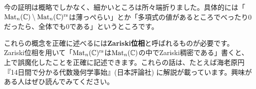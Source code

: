 今の証明は概略でしかなく、細かいところは所々端折りました。具体的には「$\operatorname{Mat}_n(\mathbb{C}) \setminus \operatorname{Mat}_n(\mathbb{C})^{\text{rs}}$は薄っぺらい」とか「多項式の値があるところでべったり$0$だったら、全体でも$0$である」というところです。

これらの概念を正確に述べるには\textbf{Zariski位相}と呼ばれるものが必要です。Zariski位相を用いて「$\operatorname{Mat}_n(\mathbb{C})^{\text{rs}}$は$\operatorname{Mat}_n(\mathbb{C})$の中でZariski稠密である」書くと、上で誤魔化したことを正確に記述できます。これらの話は、たとえば海老原円『14日間で分かる代数幾何学事始』(日本評論社) に解説が載っています。興味がある人はぜひ読んでみてください。

